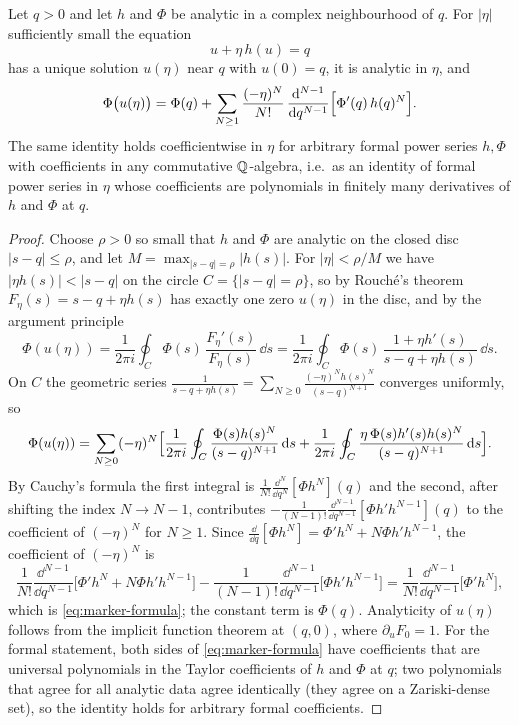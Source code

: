 \begin{theorem}
\label{thm:marker}
Let $q>0$ and let $h$ and $\Phi$ be analytic in a complex neighbourhood of $q$. For $|\eta|$ sufficiently small the equation
\begin{equation}
 u+\eta\,h(u)=q
 \label{eq:marker-equation}
\end{equation}
has a unique solution $u(\eta)$ near $q$ with $u(0)=q$, it is analytic in $\eta$, and
\begin{equation}
 \Phi\bigl(u(\eta)\bigr)=\Phi(q)+\sum_{N\ge1}\frac{(-\eta)^N}{N!}\,\frac{\mathrm d^{N-1}}{\mathrm d q^{N-1}}\Bigl[\Phi'(q)\,h(q)^N\Bigr].
 \label{eq:marker-formula}
\end{equation}
The same identity holds coefficientwise in $\eta$ for arbitrary formal power series $h,\Phi$ with coefficients in any commutative $\mathbb Q$-algebra, i.e.\ as an identity of formal power series in $\eta$ whose coefficients are polynomials in finitely many derivatives of $h$ and $\Phi$ at $q$.
\end{theorem}
\begin{proof}
Choose $\rho>0$ so small that $h$ and $\Phi$ are analytic on the closed disc $|s-q|\le\rho$, and let $M=\max_{|s-q|=\rho}|h(s)|$. For $|\eta|<\rho/M$ we have $|\eta h(s)|<|s-q|$ on the circle $C=\{|s-q|=\rho\}$, so by Rouch\'e's theorem $F_\eta(s)=s-q+\eta h(s)$ has exactly one zero $u(\eta)$ in the disc, and by the argument principle
\[
 \Phi(u(\eta))=\frac1{2\pi i}\oint_C\Phi(s)\,\frac{F_\eta'(s)}{F_\eta(s)}\,\dd s
 =\frac1{2\pi i}\oint_C\Phi(s)\,\frac{1+\eta h'(s)}{s-q+\eta h(s)}\,\dd s .
\]
On $C$ the geometric series $\frac1{s-q+\eta h(s)}=\sum_{N\ge0}\frac{(-\eta)^Nh(s)^N}{(s-q)^{N+1}}$ converges uniformly, so
\[
 \Phi(u(\eta))=\sum_{N\ge0}(-\eta)^N\Bigl[\frac1{2\pi i}\oint_C\frac{\Phi(s)h(s)^N}{(s-q)^{N+1}}\,\mathrm d s
 +\frac1{2\pi i}\oint_C\frac{\eta\,\Phi(s)h'(s)h(s)^N}{(s-q)^{N+1}}\,\mathrm d s\Bigr].
\]
By Cauchy's formula the first integral is $\frac1{N!}\frac{\dd^N}{\dd q^N}[\Phi h^N](q)$ and the second, after shifting the index $N\to N-1$, contributes $-\frac1{(N-1)!}\frac{\dd^{N-1}}{\dd q^{N-1}}[\Phi h'h^{N-1}](q)$ to the coefficient of $(-\eta)^N$ for $N\ge1$. Since $\frac{\dd}{\dd q}[\Phi h^N]=\Phi'h^N+N\Phi h'h^{N-1}$, the coefficient of $(-\eta)^N$ is
\[
 \frac1{N!}\frac{\dd^{N-1}}{\dd q^{N-1}}\bigl[\Phi'h^N+N\Phi h'h^{N-1}\bigr]-\frac1{(N-1)!}\frac{\dd^{N-1}}{\dd q^{N-1}}\bigl[\Phi h'h^{N-1}\bigr]
 =\frac1{N!}\frac{\dd^{N-1}}{\dd q^{N-1}}\bigl[\Phi'h^N\bigr],
\]
which is \eqref{eq:marker-formula}; the constant term is $\Phi(q)$. Analyticity of $u(\eta)$ follows from the implicit function theorem at $(q,0)$, where $\partial_uF_0=1$. For the formal statement, both sides of \eqref{eq:marker-formula} have coefficients that are universal polynomials in the Taylor coefficients of $h$ and $\Phi$ at $q$; two polynomials that agree for all analytic data agree identically (they agree on a Zariski-dense set), so the identity holds for arbitrary formal coefficients.
\end{proof}

